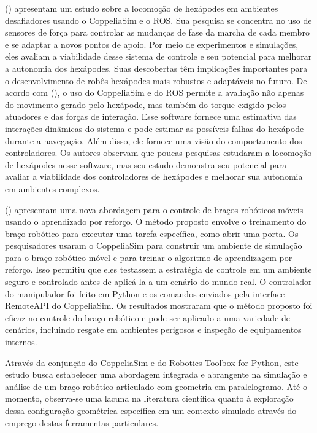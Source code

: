   (\citeyear{coelho2021}) apresentam um estudo sobre a locomoção de hexápodes em ambientes desafiadores usando o CoppeliaSim e o ROS. Sua pesquisa se concentra no uso de sensores de força para controlar as mudanças de fase da marcha de cada membro e se adaptar a novos pontos de apoio. Por meio de experimentos e simulações, eles avaliam a viabilidade desse sistema de controle e seu potencial para melhorar a autonomia dos hexápodes. Suas descobertas têm implicações importantes para o desenvolvimento de robôs hexápodes mais robustos e adaptáveis no futuro. De acordo com  (\citeyear{coelho2021}), o uso do CoppeliaSim e do ROS permite a avaliação não apenas do movimento gerado pelo hexápode, mas também do torque exigido pelos atuadores e das forças de interação. Esse software fornece uma estimativa das interações dinâmicas do sistema e pode estimar as possíveis falhas do hexápode durante a navegação. Além disso, ele fornece uma visão do comportamento dos controladores. Os autores observam que poucas pesquisas estudaram a locomoção de hexápodes nesse software, mas seu estudo demonstra seu potencial para avaliar a viabilidade dos controladores de hexápodes e melhorar sua autonomia em ambientes complexos.

 (\citeyear{wang2022research}) apresentam uma nova abordagem para o controle de braços robóticos móveis usando o aprendizado por reforço. O método proposto envolve o treinamento do braço robótico para executar uma tarefa específica, como abrir uma porta. Os pesquisadores usaram o CoppeliaSim para construir um ambiente de simulação para o braço robótico móvel e para treinar o algoritmo de aprendizagem por reforço. Isso permitiu que eles testassem a estratégia de controle em um ambiente seguro e controlado antes de aplicá-la a um cenário do mundo real. O controlador do manipulador foi feito em Python e os comandos enviados pela interface RemoteAPI do CoppeliaSim. Os resultados mostraram que o método proposto foi eficaz no controle do braço robótico e pode ser aplicado a uma variedade de cenários, incluindo resgate em ambientes perigosos e inspeção de equipamentos internos. 

 Através da conjunção do CoppeliaSim e do Robotics Toolbox for Python, este estudo busca estabelecer uma abordagem integrada e abrangente na simulação e análise de um braço robótico articulado com geometria em paralelogramo. Até o momento, observa-se uma lacuna na literatura científica quanto à exploração dessa configuração geométrica específica em um contexto simulado através do emprego destas ferramentas particulares.

